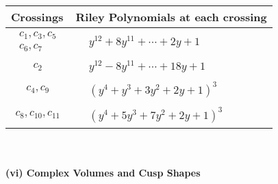 \documentclass[1p]{elsarticle_modified}
\theoremstyle{definition}
\begin{document}
\begin{tabular}{m{50pt}|m{274pt}}
Crossings & \hspace{64pt}Riley Polynomials at each crossing \\
\hline $$\begin{aligned}c_{1},c_{3},c_{5}\\c_{6},c_{7}\end{aligned}$$&$\begin{aligned}
&y^{12}+8 y^{11}+\cdots+2 y+1
\end{aligned}$\\
\hline $$\begin{aligned}c_{2}\end{aligned}$$&$\begin{aligned}
&y^{12}-8 y^{11}+\cdots+18 y+1
\end{aligned}$\\
\hline $$\begin{aligned}c_{4},c_{9}\end{aligned}$$&$\begin{aligned}
&(y^4+y^3+3 y^2+2 y+1)^3
\end{aligned}$\\
\hline $$\begin{aligned}c_{8},c_{10},c_{11}\end{aligned}$$&$\begin{aligned}
&(y^4+5 y^3+7 y^2+2 y+1)^3
\end{aligned}$\\
\hline
\end{tabular}\\~\\
\newpage\flushleft \textbf{(vi) Complex Volumes and Cusp Shapes}
\end{document}
